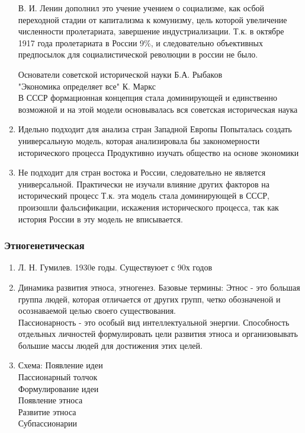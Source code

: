 \documentclass[a4paper]{article}
\begin{document}
\begin{enumerate}
    В. И. Ленин дополнил это учение учением о социализме, как осбой переходной стадии от капитализма к комунизму, цель которой увеличение численности пролетариата, завершение индустриализации. Т.к. в октябре 1917 года пролетариата в России 9\%, и следовательно объективных предпосылок для социалистической революции в россии не было.

    Основатели советской исторической науки
    Б.А. Рыбаков \\
    "Экономика определяет все" К. Маркс \\
    В СССР формационная концепция стала доминирующей и единственно возможной и на этой модели основывалась вся советская историческая наука
    \item
    Идельно подходит для анализа стран Западной Европы
    Попыталась создать универсальную модель, которая анализировала бы закономерности исторического процесса
    Продуктивно изучать общество на основе экономики
    \item
    Не подходит для стран востока и России, следовательно не является универсальной.
    Практически не изучали влияние других факторов на исторический процесс
    Т.к. эта модель стала доминирующей в СССР, произошли фальсификации, искажения исторического процесса, так как история России в эту модель не вписывается.
\end{enumerate}
    \subsubsection{Этногенетическая}
    \begin{enumerate}
    \item Л. Н. Гумилев. 1930е годы. Существуюет с 90х годов
    \item Динамика развития этноса, этногенез. Базовые термины:
        Этнос - это большая группа людей, которая отличается от других групп, четко обозначеной и осознаваемой целью своего существования. \\
        Пассионарность - это особый вид интеллектуальной энергии. Способность отдельных личностей формулировать цели развития этноса и организовывать большие массы людей для достижения этих целей.
    \item Схема:
        Появление идеи \\
        Пассионарный толчок \\
        Формулирование идеи \\
        Появление этноса \\
        Развитие этноса \\
        Субпассионарии \\
    \end{enumerate}
\end{document}
